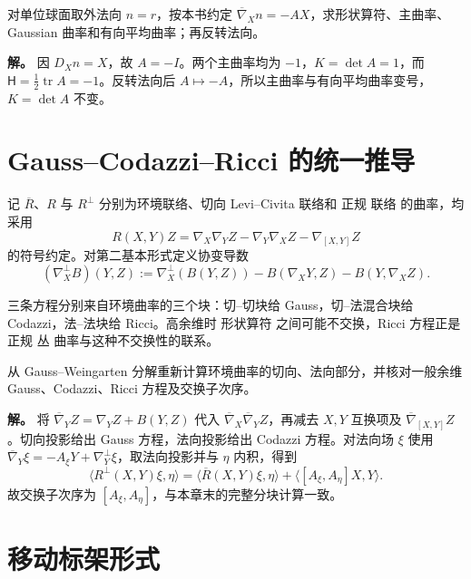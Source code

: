 \begin{workedexample}
对单位球面取外法向 \(n=r\)，按本书约定 \(\overline\nabla_Xn=-AX\)，求形状算符、主曲率、Gaussian 曲率和有向平均曲率；再反转法向。

\textbf{解。} 因 \(D_Xn=X\)，故 \(A=-I\)。两个主曲率均为 \(-1\)，\(K=\det A=1\)，而 \(\mathsf H=\tfrac12\operatorname{tr}A=-1\)。反转法向后 \(A\mapsto-A\)，所以主曲率与有向平均曲率变号，\(K=\det A\) 不变。
\end{workedexample}

\section{Gauss--Codazzi--Ricci 的统一推导}

记 $\overline R$、$R$ 与 $R^\perp$ 分别为环境联络、切向 Levi--Civita 联络和 正规 联络 的曲率，均采用
\[
R(X,Y)Z
=\nabla_X\nabla_YZ-\nabla_Y\nabla_XZ-\nabla_{[X,Y]}Z
\]
的符号约定。对第二基本形式定义协变导数
\begin{equation*}(\nabla_X^\perp B)(Y,Z)
:=\nabla_X^\perp(B(Y,Z))
-B(\nabla_XY,Z)-B(Y,\nabla_XZ).
\end{equation*}

三条方程分别来自环境曲率的三个块：切--切块给 Gauss，切--法混合块给 Codazzi，法--法块给 Ricci。高余维时 形状算符 之间可能不交换，Ricci 方程正是 正规 丛 曲率与这种不交换性的联系。

\begin{workedexample}
从 Gauss--Weingarten 分解重新计算环境曲率的切向、法向部分，并核对一般余维 Gauss、Codazzi、Ricci 方程及交换子次序。

\textbf{解。} 将 \(\overline\nabla_YZ=\nabla_YZ+B(Y,Z)\) 代入 \(\overline\nabla_X\overline\nabla_YZ\)，再减去 \(X,Y\) 互换项及 \(\overline\nabla_{[X,Y]}Z\)。切向投影给出 Gauss 方程，法向投影给出 Codazzi 方程。对法向场 \(\xi\) 使用 \(\overline\nabla_Y\xi=-A_\xi Y+\nabla_Y^\perp\xi\)，取法向投影并与 \(\eta\) 内积，得到
\[
\langle R^\perp(X,Y)\xi,\eta\rangle
=\langle\overline R(X,Y)\xi,\eta\rangle+\langle[A_\xi,A_\eta]X,Y\rangle.
\]
故交换子次序为 \([A_\xi,A_\eta]\)，与本章末的完整分块计算一致。
\end{workedexample}


\section{移动标架形式}

